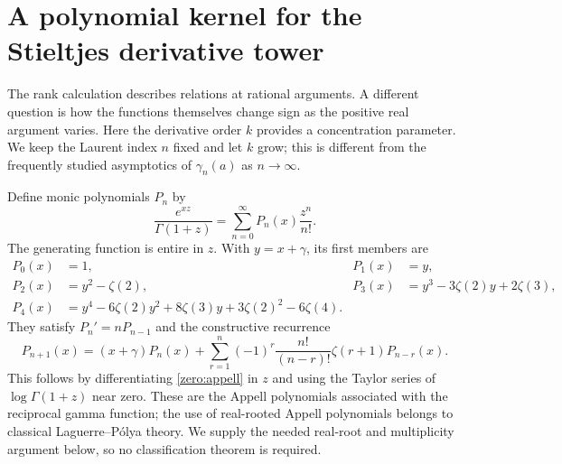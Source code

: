 \documentclass[11pt,a4paper]{article}
\theoremstyle{definition}
\theoremstyle{remark}
\numberwithin{equation}{section}
\begin{document}
\section{A polynomial kernel for the Stieltjes derivative tower}
\label{zero:section}

The rank calculation describes relations at rational arguments.  A different
question is how the functions themselves change sign as the positive real
argument varies.  Here the derivative order $k$ provides a concentration
parameter.  We keep the Laurent index $n$ fixed and let $k$ grow; this is
different from the frequently studied asymptotics of $\gamma_n(a)$ as
$n\to\infty$.

Define monic polynomials $P_n$ by
\begin{equation}\label{zero:appell}
 \frac{e^{xz}}{\Gamma(1+z)}
   =\sum_{n=0}^{\infty}P_n(x)\frac{z^n}{n!}.
\end{equation}
The generating function is entire in $z$.  With $y=x+\gamma$, its first
members are
\begin{align*}
 P_0(x)&=1, & P_1(x)&=y,\\
 P_2(x)&=y^2-\zeta(2),&
 P_3(x)&=y^3-3\zeta(2)y+2\zeta(3),\\
 P_4(x)&=y^4-6\zeta(2)y^2+8\zeta(3)y
                       +3\zeta(2)^2-6\zeta(4).
\end{align*}
They satisfy $P_n'=nP_{n-1}$ and the constructive recurrence
\begin{equation}\label{zero:recurrence}
 P_{n+1}(x)=(x+\gamma)P_n(x)
       +\sum_{r=1}^{n}(-1)^r\frac{n!}{(n-r)!}\zeta(r+1)P_{n-r}(x).
\end{equation}
This follows by differentiating \eqref{zero:appell} in $z$ and using the
Taylor series of $\log\Gamma(1+z)$ near zero.  These are the Appell
polynomials associated with the reciprocal gamma function; the use of
real-rooted Appell polynomials belongs to classical Laguerre--P\'olya
theory.  We supply the needed real-root and multiplicity argument below,
so no classification theorem is required.
\end{document}
